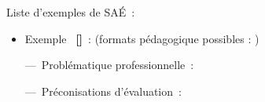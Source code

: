 Liste d'exemples de SAÉ~:
\begin{itemize}[nosep,topsep=0pt,label=\textbullet,leftmargin=1pc,labelsep=*]
\item Exemple~ \textbf{[]}~: 
  (formats pédagogique possibles : )
\par
  ---~Problématique professionnelle~: \par
  ---~Préconisations d'évaluation~: \par
\end{itemize}

